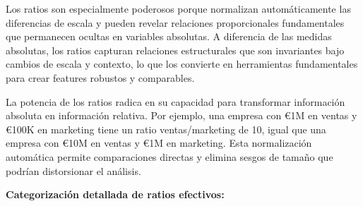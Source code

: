 \documentclass[
  letterpaper,
  DIV=11,
  numbers=noendperiod]{scrreprt}
\begin{document}
Los ratios son especialmente poderosos porque normalizan automáticamente
las diferencias de escala y pueden revelar relaciones proporcionales
fundamentales que permanecen ocultas en variables absolutas. A
diferencia de las medidas absolutas, los ratios capturan relaciones
estructurales que son invariantes bajo cambios de escala y contexto, lo
que los convierte en herramientas fundamentales para crear features
robustos y comparables.

La potencia de los ratios radica en su capacidad para transformar
información absoluta en información relativa. Por ejemplo, una empresa
con €1M en ventas y €100K en marketing tiene un ratio ventas/marketing
de 10, igual que una empresa con €10M en ventas y €1M en marketing. Esta
normalización automática permite comparaciones directas y elimina sesgos
de tamaño que podrían distorsionar el análisis.

\textbf{Categorización detallada de ratios efectivos:}
\end{document}
